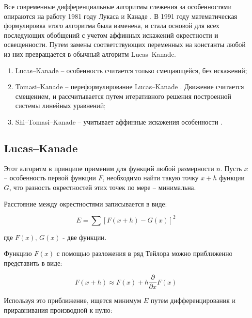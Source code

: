 Все современные дифференциальные алгоритмы слежения за особенностями опираются на работу 1981 году Лукаса и Канаде \cite{lyka_kan}. В 1991 году математическая формулировка этого алгоритма была изменена, и стала основой для всех последующих обобщений с учетом аффинных искажений окрестности и освещенности. Путем замены соответствующих переменных на константы любой из них превращается в обычный алгоритм Lucas–Kanade.

\begin{enumerate}
\item Lucas–Kanade – особенность считается только смещающейся, без искажений;
\item Tomasi–Kanade – переформулирование Lucas–Kanade \cite{tom_lyk}. Движение считается смещением, и рассчитывается путем итеративного решения построенной системы линейных уравнений;
\item Shi–Tomasi–Kanade – учитывает аффинные искажения особенности \cite{shi_tom_lyk}.
\end{enumerate}

\subsection{Lucas–Kanade}

Этот алгоритм в принципе применим для функций любой размерности $n$. Пусть $x$ – особенность первой функции $F$, необходимо найти такую точку $x+h$ функции $G$, что разность окрестностей этих точек по мере – минимальна.

Расстояние между окрестностями записывается в виде:

\begin{equation}
E=\sum [F(x+h)-G(x)]^2
\end{equation}

где $F(x)$, $G(x)$ - две функции.

Функцию $F(x)$ с помощью разложения в ряд Тейлора можно приближенно представить в виде:

\begin{equation}
F(x+h)\approx F(x)+h\frac{\partial}{\partial x}F(x)
\end{equation}

Используя это приближение, ищется минимум $E$ путем дифференцирования и приравнивания производной к нулю:

